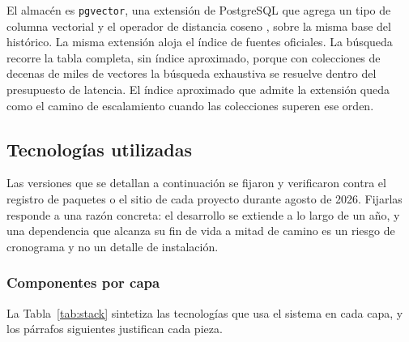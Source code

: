 El almacén es \texttt{pgvector}, una extensión de PostgreSQL que agrega un tipo de columna vectorial y el operador de distancia coseno \parencite{Kane2026}, sobre la misma base del histórico. La misma extensión aloja el índice de fuentes oficiales. La búsqueda recorre la tabla completa, sin índice aproximado, porque con colecciones de decenas de miles de vectores la búsqueda exhaustiva se resuelve dentro del presupuesto de latencia. El índice aproximado que admite la extensión queda como el camino de escalamiento cuando las colecciones superen ese orden.

\subsection{Tecnologías utilizadas}
\label{sec:tecnologias}

Las versiones que se detallan a continuación se fijaron y verificaron contra el registro de paquetes o el sitio de cada proyecto durante agosto de 2026. Fijarlas responde a una razón concreta: el desarrollo se extiende a lo largo de un año, y una dependencia que alcanza su fin de vida a mitad de camino es un riesgo de cronograma y no un detalle de instalación.

\subsubsection{Componentes por capa}

La Tabla~\ref{tab:stack} sintetiza las tecnologías que usa el sistema en cada capa, y los párrafos siguientes justifican cada pieza.

